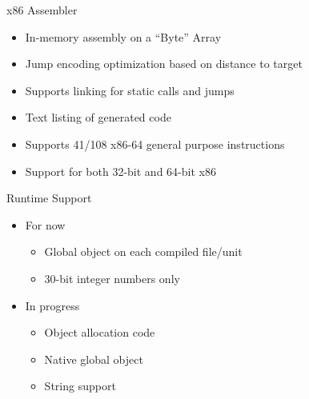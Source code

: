 \begin{frame}{x86 Assembler}
    \begin{itemize}
        \item In-memory assembly on a “Byte” Array
        \item Jump encoding optimization based on distance to target
        \item Supports linking for static calls and jumps
        \item Text listing of generated code
        \item Supports 41/108  x86-64 general purpose instructions
        \item Support for both 32-bit and 64-bit x86
    \end{itemize}
\end{frame}

\begin{frame}{Runtime Support}
    \begin{itemize}
        \item For now
        \begin{itemize}
            \item Global object on each compiled file/unit
            \item 30-bit integer numbers only
        \end{itemize}
        \item In progress
        \begin{itemize}
            \item Object allocation code
            \item Native global object
            \item String support
        \end{itemize}
    \end{itemize}
\end{frame}

